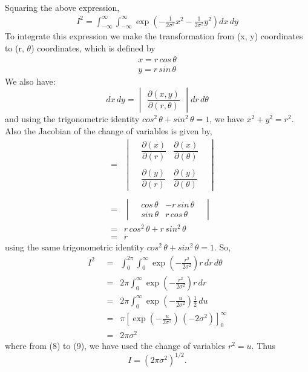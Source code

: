 \documentclass{article}
\begin{document}
Squaring the above expression,
\begin{align}
I^2 = \int_{-\infty}^{\infty}\int_{-\infty}^{\infty} \exp\left(-\frac{1}{2\sigma^2}x^2-\frac{1}{2\sigma^2}y^2\right)dx\,dy
\end{align}
To integrate this expression we make the transformation from  (x, y) coordinates to (r, $\theta$) coordinates, which is defined by
\begin{align}
x = r \, cos\,\theta\\
y = r \, sin\, \theta
\end{align}
We also have:
$$
dx\,dy = \begin{vmatrix}\dfrac{\partial \left(x, y\right)}{\partial \left(r, \theta\right)}\end{vmatrix}dr\,d\theta
$$
and using the trigonometric identity $cos^2\,\theta + sin^2\, \theta = 1$, we have $x^2 + y^2 = r^2$. Also the Jacobian of the change of variables is given by,
\begin{align*}
 \,\,&= \,\,\,\begin{vmatrix}
&\dfrac{\partial \left(x \right)}{\partial \left(r \right)} &\dfrac{\partial \left(x \right)}{\partial \left(\theta \right)}&\\
\\
&\dfrac{\partial \left(y \right)}{\partial \left(r \right)} &\dfrac{\partial \left(y \right)}{\partial \left(\theta \right)}&
\end{vmatrix}\\
\\
&= \,\,\,
\begin{vmatrix}
&cos \,\theta &-r\,sin \, \theta&
\\
&sin \,\theta &r\,cos\,\theta&
\end{vmatrix}\\
&=\,\,\, r\, cos^2\,\theta + r\, sin^2\,\theta
\\
&=\,\,\, r
\end{align*}
using the same trigonometric identity $cos^2\,\theta + sin^2\, \theta = 1$.
So, 
\begin{align}
I^2 \,\,&=\,\,\, \int_{0}^{2\pi}\int_{0}^{\infty} \exp\left(-\frac{r^2}{2\sigma^2}\right) r\,dr\,d\theta 
\\
&= \,\,\,2\pi\int_{0}^{\infty} \exp\left(-\frac{r^2}{2\sigma^2}\right) r\,dr
\\
&= \,\,\,2\pi\int_{0}^{\infty} \exp\left(-\frac{u}{2\sigma^2}\right) \frac{1}{2}\,du
\\
&=\,\,\,\pi\left[\exp\left(-\frac{u}{2\sigma^2}\right)\,\left(-2\sigma^2\right)\right]_0^\infty
\\
&=\,\,\,2\pi\sigma^2
\end{align}
where from (8) to (9), we have used the change of variables $r^2 = u$.
Thus $$I = \left(2\pi\sigma^2\right)^{1/2}.$$
\end{document}
